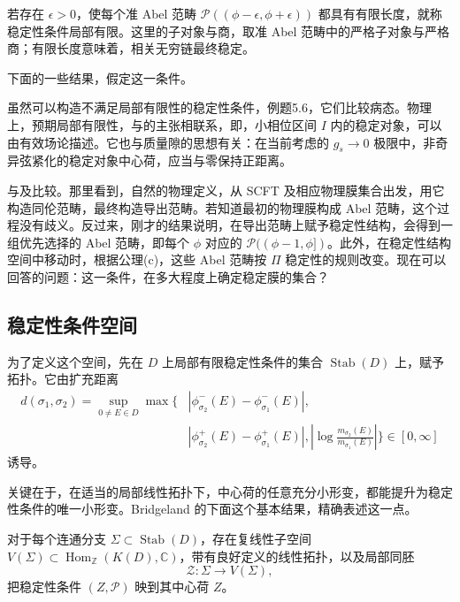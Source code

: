\begin{definition*}[局部有限性]
若存在 $\epsilon>0$，使每个准 Abel 范畴 $\mathcal{P}((\phi-\epsilon,\phi+\epsilon))$ 都具有有限长度，就称稳定性条件局部有限。这里的子对象与商，取准 Abel 范畴中的严格子对象与严格商；有限长度意味着，相关无穷链最终稳定。
\end{definition*}
下面的一些结果，假定这一条件。

虽然可以构造不满足局部有限性的稳定性条件，例题5.6，它们比较病态。物理上，预期局部有限性，与的主张相联系，即，小相位区间 $I$ 内的稳定对象，可以由有效场论描述。它也与质量隙的思想有关：在当前考虑的 $g_s\to0$ 极限中，非奇异弦紧化的稳定对象中心荷，应当与零保持正距离。

与及比较。那里看到，自然的物理定义，从 SCFT 及相应物理膜集合出发，用它构造同伦范畴，最终构造导出范畴。若知道最初的物理膜构成 Abel 范畴，这个过程没有歧义。反过来，刚才的结果说明，在导出范畴上赋予稳定性结构，会得到一组优先选择的 Abel 范畴，即每个 $\phi$ 对应的 $\mathcal{P}((\phi-1,\phi])$。此外，在稳定性结构空间中移动时，根据公理(c)，这些 Abel 范畴按 $\Pi$ 稳定性的规则改变。现在可以回答的问题：这一条件，在多大程度上确定稳定膜的集合？

\subsection{稳定性条件空间}\label{sec:5.7.2}

为了定义这个空间，先在 $D$ 上局部有限稳定性条件的集合 $\operatorname{Stab}(D)$ 上，赋予拓扑。它由扩充距离
\[
\begin{aligned}
d(\sigma_1,\sigma_2)=\sup_{0\ne E\in D}\max\biggl\{
&|\phi_{\sigma_2}^-(E)-\phi_{\sigma_1}^-(E)|,\\
&|\phi_{\sigma_2}^+(E)-\phi_{\sigma_1}^+(E)|,
\left|\log\frac{m_{\sigma_2}(E)}{m_{\sigma_1}(E)}\right|\biggr\}
\in[0,\infty]
\end{aligned}
\]
诱导。

关键在于，在适当的局部线性拓扑下，中心荷的任意充分小形变，都能提升为稳定性条件的唯一小形变。Bridgeland 的下面这个基本结果，精确表述这一点。
\begin{theorem}\label{thm:5.37}
对于每个连通分支 $\Sigma\subset\operatorname{Stab}(D)$，存在复线性子空间 $V(\Sigma)\subset\operatorname{Hom}_{\mathbb{Z}}(K(D),\mathbb{C})$，带有良好定义的线性拓扑，以及局部同胚
\[
\mathcal{Z}\colon\Sigma\longrightarrow V(\Sigma),
\]
把稳定性条件 $(Z,\mathcal{P})$ 映到其中心荷 $Z$。
\end{theorem}

